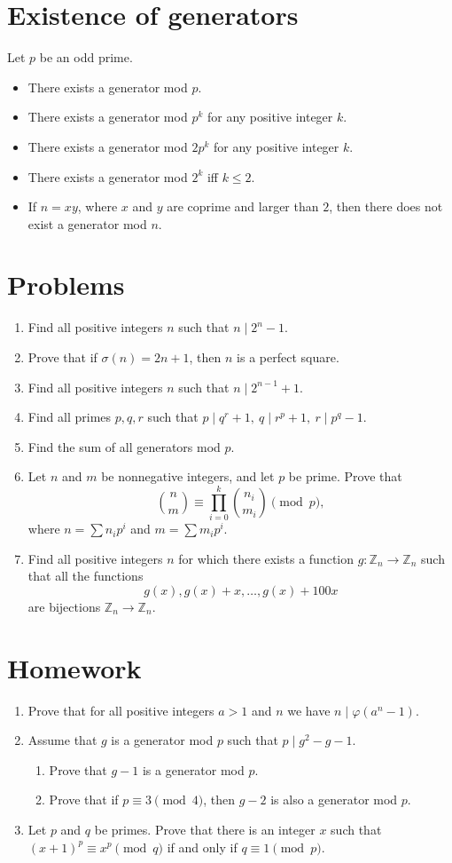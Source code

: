 \documentclass{article}
\newcommand\Zz{\mathbb{Z}}
\begin{document}
\section{Existence of generators}
Let $p$ be an odd prime.
\begin{itemize}
  \item There exists a generator mod $p$.
  \item There exists a generator mod $p^k$ for any positive integer $k$.
  \item There exists a generator mod $2p^k$ for any positive integer $k$.
  \item There exists a generator mod $2^k$ iff $k\le 2$.
  \item If $n=xy$, where $x$ and $y$ are coprime and larger than $2$, then there
    does not exist a generator mod $n$.
\end{itemize}
\newpage
\section{Problems}
\begin{enumerate}
  \item Find all positive integers $n$ such that $n\mid 2^n-1$.
  \item Prove that if $\sigma(n)=2n+1$, then $n$ is a perfect square.
  \item Find all positive integers $n$ such that $n\mid 2^{n-1}+1$.
  \item Find all primes $p,q,r$ such that $p\mid q^r+1,\ q\mid r^p+1,\ r\mid
    p^q-1$.
  \item Find the sum of all generators mod $p$.
  \item Let $n$ and $m$ be nonnegative integers, and let $p$ be prime. Prove
    that
    \[\binom nm\equiv\prod_{i=0}^k\binom{n_i}{m_i}\pmod p,\]
    where $n=\sum n_i p^i$ and $m=\sum m_i p^i$.
  \item Find all positive integers $n$ for which there exists a function
    $g:\Zz_n\to\Zz_n$ such that all the functions
    \[g(x),g(x)+x,\ldots,g(x)+100x\]
    are bijections $\Zz_n\to\Zz_n$.
\end{enumerate}
\newpage
\section{Homework}
\begin{enumerate}
  \item Prove that for all positive integers $a>1$ and $n$ we have
    $n\mid\varphi(a^n-1)$.
  \item Assume that $g$ is a generator mod $p$ such that $p\mid g^2-g-1$.
    \begin{enumerate}
      \item Prove that $g-1$ is a generator mod $p$.
      \item Prove that if $p\equiv 3\pmod 4$, then $g-2$ is also a generator mod
        $p$.
    \end{enumerate}
  \item Let $p$ and $q$ be primes. Prove that there is an integer $x$ such that
    $(x+1)^p\equiv x^p\pmod q$ if and only if $q\equiv 1\pmod p$.
\end{enumerate}
\end{document}
